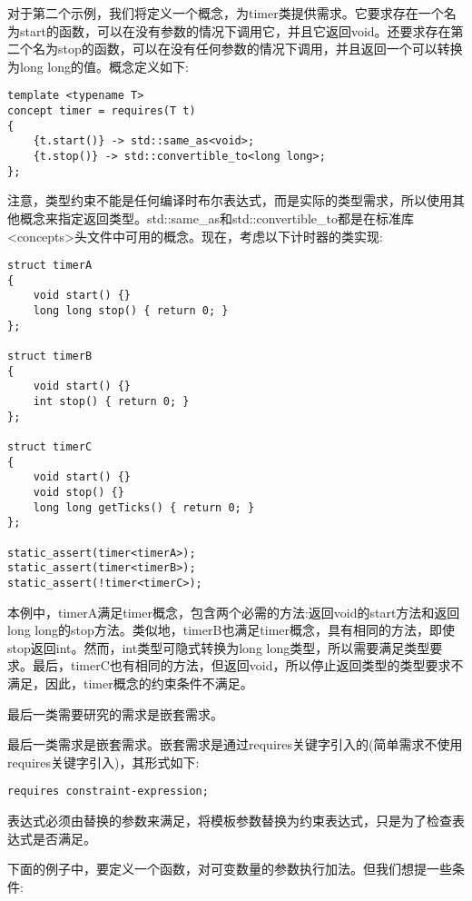 对于第二个示例，我们将定义一个概念，为timer类提供需求。它要求存在一个名为start的函数，可以在没有参数的情况下调用它，并且它返回void。还要求存在第二个名为stop的函数，可以在没有任何参数的情况下调用，并且返回一个可以转换为long long的值。概念定义如下:

\begin{lstlisting}[style=styleCXX]
template <typename T>
concept timer = requires(T t)
{
	{t.start()} -> std::same_as<void>;
	{t.stop()} -> std::convertible_to<long long>;
};
\end{lstlisting}

注意，类型约束不能是任何编译时布尔表达式，而是实际的类型需求，所以使用其他概念来指定返回类型。std::same\_as和std::convertible\_to都是在标准库<concepts>头文件中可用的概念。现在，考虑以下计时器的类实现:

\begin{lstlisting}[style=styleCXX]
struct timerA
{
	void start() {}
	long long stop() { return 0; }
};

struct timerB
{
	void start() {}
	int stop() { return 0; }
};

struct timerC
{
	void start() {}
	void stop() {}
	long long getTicks() { return 0; }
};

static_assert(timer<timerA>);
static_assert(timer<timerB>);
static_assert(!timer<timerC>);
\end{lstlisting}

本例中，timerA满足timer概念，包含两个必需的方法:返回void的start方法和返回long long的stop方法。类似地，timerB也满足timer概念，具有相同的方法，即使stop返回int。然而，int类型可隐式转换为long long类型，所以需要满足类型要求。最后，timerC也有相同的方法，但返回void，所以停止返回类型的类型要求不满足，因此，timer概念的约束条件不满足。

最后一类需要研究的需求是嵌套需求。


最后一类需求是嵌套需求。嵌套需求是通过requires关键字引入的(简单需求不使用requires关键字引入)，其形式如下:

\begin{lstlisting}[style=styleCXX]
requires constraint-expression;
\end{lstlisting}

表达式必须由替换的参数来满足，将模板参数替换为约束表达式，只是为了检查表达式是否满足。

下面的例子中，要定义一个函数，对可变数量的参数执行加法。但我们想提一些条件:

